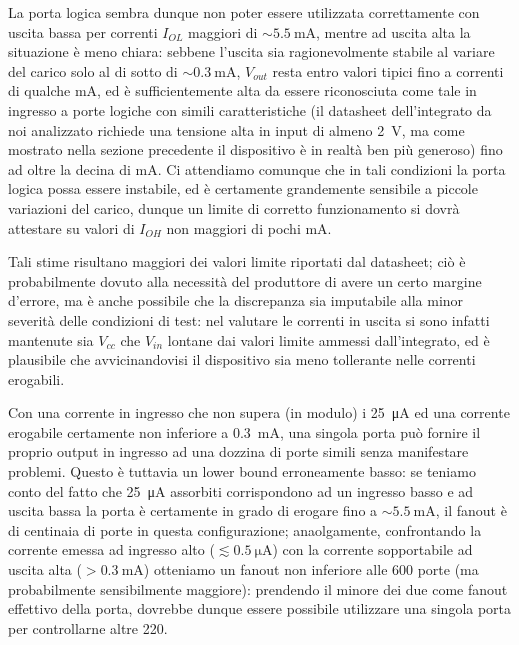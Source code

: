 	La porta logica sembra dunque non poter essere utilizzata correttamente con
	uscita bassa per correnti $I_{OL}$ maggiori di $\sim \SI{5.5}{\mA}$, mentre
	ad uscita alta la situazione è meno chiara: sebbene l'uscita sia
	ragionevolmente stabile al variare del carico solo al di sotto di
	$\sim \SI{0.3}{\mA}$, $V_{out}$ resta entro valori tipici fino a correnti
	di qualche \si{\mA}, ed è sufficientemente alta da essere riconosciuta
	come tale in ingresso a porte logiche con simili caratteristiche (il
	datasheet dell'integrato da noi analizzato richiede una tensione alta in
	input di almeno \SI{2}{\V}, ma come mostrato nella sezione precedente il
	dispositivo è in realtà ben più generoso) fino ad oltre la decina di \si{\mA}.
	Ci attendiamo comunque che in tali condizioni la porta logica possa essere
	instabile, ed è certamente grandemente sensibile a piccole variazioni del
	carico, dunque un limite di corretto funzionamento si dovrà attestare
	su valori di $I_{OH}$ non maggiori di pochi \si{\mA}.

	Tali stime risultano maggiori dei valori limite riportati dal datasheet;
	ciò è probabilmente dovuto alla necessità del produttore di avere un certo
	margine d'errore, ma è anche possibile che la discrepanza sia imputabile
	alla minor severità delle condizioni di test: nel valutare le correnti in
	uscita si sono infatti mantenute sia $V_{cc}$ che $V_{in}$ lontane dai
	valori limite ammessi dall'integrato, ed è plausibile che avvicinandovisi
	il dispositivo sia meno tollerante nelle correnti erogabili.

	Con una corrente in ingresso che non supera (in modulo) i \SI{25}{\uA} ed
	una corrente erogabile certamente non inferiore a \SI{0.3}{\mA},
	una singola porta può fornire il proprio output in ingresso ad una dozzina
	di porte simili senza manifestare problemi. Questo è tuttavia un lower bound
	erroneamente basso: se teniamo conto del fatto che \SI{25}{\uA} assorbiti
	corrispondono ad un ingresso basso e ad uscita bassa la porta è certamente
	in grado di	erogare fino a $\sim \SI{5.5}{\mA}$, il fanout è di centinaia
	di porte in questa configurazione; anaolgamente, confrontando la corrente
	emessa ad ingresso alto ($\lesssim \SI{0.5}{\micro \ampere}$) con la
	corrente sopportabile ad uscita alta ($ > \SI{0.3}{\mA}$) otteniamo un
	fanout non inferiore alle 600 porte (ma probabilmente sensibilmente
	maggiore): prendendo il minore dei due come fanout effettivo della porta,
	dovrebbe dunque essere possibile utilizzare una singola porta per
	controllarne altre 220.


